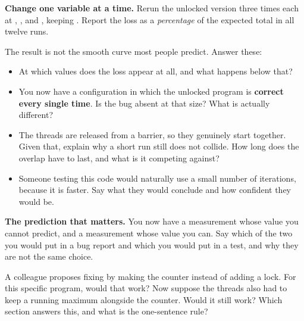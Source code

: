  \textbf{Change one variable at a time.} Rerun the unlocked version three times each at
, ,  and , keeping . Report
the loss as a \emph{percentage} of the expected total in all twelve runs.

The result is not the smooth curve most people predict. Answer these:
\begin{itemize}
  \item At which values does the loss appear at all, and what happens below that?
  \item You now have a configuration in which the unlocked program is \textbf{correct every single
    time}. Is the bug absent at that size? What is actually different?
  \item The threads are released from a barrier, so they genuinely start together. Given that,
    explain why a short run still does not collide. How long does the overlap have to last, and what
    is it competing against?
  \item Someone testing this code would naturally use a small number of iterations, because it is
    faster. Say what they would conclude and how confident they would be.
\end{itemize}

 \textbf{The prediction that matters.} You now have a measurement whose value you cannot
predict, and a measurement whose value you can. Say which of the two you would put in a bug report
and which you would put in a test, and why they are not the same choice.

 A colleague proposes fixing  by making the counter  instead
of adding a lock. For this specific program, would that work? Now suppose the threads also had to
keep a running maximum alongside the counter. Would it still work? Which section answers
this, and what is the one-sentence rule?
